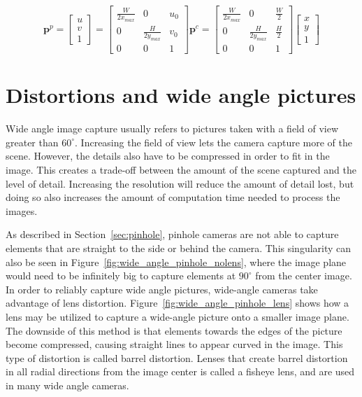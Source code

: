 \begin{equation}
    \mathbf{p}^p = \begin{bmatrix}
        u \\ v \\ 1
    \end{bmatrix} = \begin{bmatrix}
        \frac{W}{2x_{max}} & 0 & u_0 \\
        0 & \frac{H}{2y_{max}} & v_0 \\
        0 & 0 & 1
    \end{bmatrix} \mathbf{p}^c =
    \begin{bmatrix}
        \frac{W}{2x_{max}} & 0 & \frac{W}{2} \\
        0 & \frac{H}{2y_{max}} & \frac{H}{2} \\
        0 & 0 & 1
    \end{bmatrix}\begin{bmatrix}
        x \\ y \\ 1
    \end{bmatrix}
    \label{eq:pixel_transform}
\end{equation}

\section{Distortions and wide angle pictures}

Wide angle image capture usually refers to pictures taken with a field of view greater than $60^\circ$. Increasing the field of view lets the camera capture more of the scene. However, the details also have to be compressed in order to fit in the image. This creates a trade-off between the amount of the scene captured and the level of detail. Increasing the resolution will reduce the amount of detail lost, but doing so also increases the amount of computation time needed to process the images.

As described in Section~\ref{sec:pinhole}, pinhole cameras are not able to capture elements that are straight to the side or behind the camera. This singularity can also be seen in Figure~\ref{fig:wide_angle_pinhole_nolens}, where the image plane would need to be infinitely big to capture elements at $90^\circ$ from the center image. In order to reliably capture wide angle pictures, wide-angle cameras take advantage of lens distortion. Figure~\ref{fig:wide_angle_pinhole_lens} shows how a lens may be utilized to capture a wide-angle picture onto a smaller image plane. The downside of this method is that elements towards the edges of the picture become compressed, causing straight lines to appear curved in the image. This type of distortion is called barrel distortion. Lenses that create barrel distortion in all radial directions from the image center is called a fisheye lens, and are used in many wide angle cameras.


